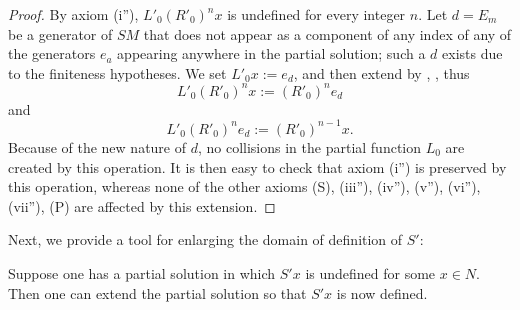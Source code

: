 \begin{proof}  By axiom (i''), $L'_0 (R'_0)^n x$ is undefined for every integer $n$.  Let $d = E_m$ be a generator of $SM$ that does not appear as a component of any index of any of the generators $e_a$ appearing anywhere in the partial solution; such a $d$ exists due to the finiteness hypotheses.  We set $L'_0 x := e_d$, and then extend by , , thus
$$L'_0 (R'_0)^n x := (R'_0)^n e_d$$
and
$$L'_0 (R'_0)^n e_d := (R'_0)^{n-1} x.$$
Because of the new nature of $d$, no collisions in the partial function $L_0$ are created by this operation.  It is then easy to check that axiom (i'') is preserved by this operation, whereas none of the other axioms (S), (iii''), (iv''), (v''), (vi''), (vii''), (P) are affected by this extension.
\end{proof}

Next, we provide a tool for enlarging the domain of definition of $S'$:

\begin{proposition}[Enlarging $S'$]\label{enlarge-S}\leanok  Suppose one has a partial solution in which $S'x$ is undefined for some $x \in N$.  Then one can extend the partial solution so that $S'x$ is now defined.
\end{proposition}

